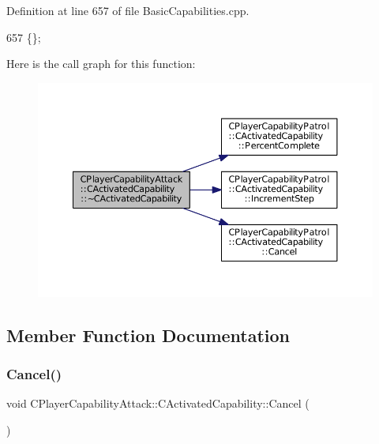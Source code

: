 Definition at line 657 of file Basic\+Capabilities.\+cpp.


\begin{DoxyCode}
657 \{\};
\end{DoxyCode}
Here is the call graph for this function\+:\nopagebreak
\begin{figure}[H]
\begin{center}
\leavevmode
\includegraphics[width=350pt]{classCPlayerCapabilityAttack_1_1CActivatedCapability_a8524b57d63ce6e899630ef56326be98b_cgraph}
\end{center}
\end{figure}


\subsection{Member Function Documentation}
\hypertarget{classCPlayerCapabilityAttack_1_1CActivatedCapability_a0796fbda8a35b60a2320becfdf2b5c13}{}\label{classCPlayerCapabilityAttack_1_1CActivatedCapability_a0796fbda8a35b60a2320becfdf2b5c13} 
\subsubsection{\texorpdfstring{Cancel()}{Cancel()}}
{\footnotesize\ttfamily void C\+Player\+Capability\+Attack\+::\+C\+Activated\+Capability\+::\+Cancel (\begin{DoxyParamCaption}{ }\end{DoxyParamCaption})\hspace{0.3cm}{\ttfamily [virtual]}}



